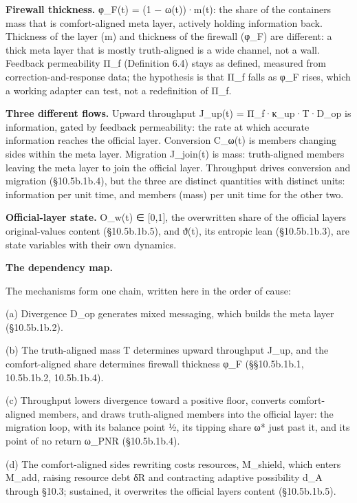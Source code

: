 \documentclass[
]{article}
\begin{document}
\textbf{Firewall thickness.} φ\_F(t) = (1 − ω(t))·m(t): the share of the
container\textquotesingle s mass that is comfort-aligned meta layer,
actively holding information back. Thickness of the layer (m) and
thickness of the firewall (φ\_F) are different: a thick meta layer that
is mostly truth-aligned is a wide channel, not a wall. Feedback
permeability Π\_f (Definition 6.4) stays as defined, measured from
correction-and-response data; the hypothesis is that Π\_f falls as φ\_F
rises, which a working adapter can test, not a redefinition of Π\_f.

\textbf{Three different flows.} Upward throughput J\_up(t) =
Π\_f·κ\_up·T·D\_op is information, gated by feedback permeability: the
rate at which accurate information reaches the official layer.
Conversion C\_ω(t) is members changing sides within the meta layer.
Migration J\_join(t) is mass: truth-aligned members leaving the meta
layer to join the official layer. Throughput drives conversion and
migration (§10.5b.1b.4), but the three are distinct quantities with
distinct units: information per unit time, and members (mass) per unit
time for the other two.

\textbf{Official-layer state.} O\_w(t) ∈ {[}0,1{]}, the overwritten
share of the official layer\textquotesingle s original-values content
(§10.5b.1b.5), and ϑ(t), its entropic lean (§10.5b.1b.3), are state
variables with their own dynamics.

\textbf{The dependency map.}

The mechanisms form one chain, written here in the order of cause:

(a) Divergence D\_op generates mixed messaging, which builds the meta
layer (§10.5b.1b.2).

(b) The truth-aligned mass T determines upward throughput J\_up, and the
comfort-aligned share determines firewall thickness φ\_F (§§10.5b.1b.1,
10.5b.1b.2, 10.5b.1b.4).

(c) Throughput lowers divergence toward a positive floor, converts
comfort-aligned members, and draws truth-aligned members into the
official layer: the migration loop, with its balance point ½, its
tipping share ω* just past it, and its point of no return ω\_PNR
(§10.5b.1b.4).

(d) The comfort-aligned side\textquotesingle s rewriting costs
resources, M\_shield, which enters M\_add, raising resource debt δR and
contracting adaptive possibility d\_A through §10.3; sustained, it
overwrites the official layer\textquotesingle s content (§10.5b.1b.5).
\end{document}
